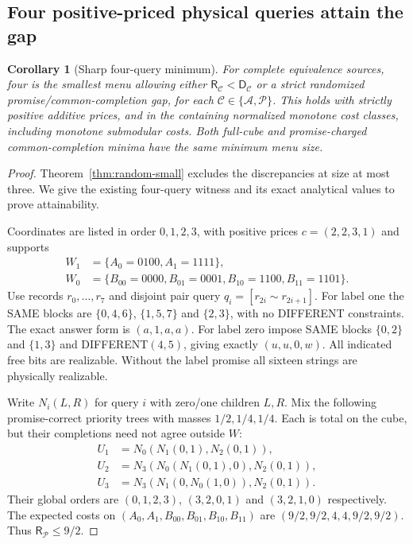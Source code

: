 \documentclass[pdflatex,sn-mathphys-num]{sn-jnl}
\newcommand{\DR}{\mathsf{D}}
\newcommand{\RR}{\mathsf{R}}
\theoremstyle{thmstyleone}
\newtheorem{corollary}[theorem]{Corollary}
\theoremstyle{thmstylethree}
\theoremstyle{thmstyletwo}
\begin{document}
\subsection{Four positive-priced physical queries attain the gap}
\begin{corollary}[Sharp four-query minimum]\label{cor:random-minimum}
For complete equivalence sources, four is the smallest menu allowing either $\RR_{\mathcal C}<\DR_{\mathcal C}$ or a strict randomized promise/common-completion gap, for each $\mathcal C\in\{\mathcal A,\mathcal P\}$. This holds with strictly positive additive prices, and in the containing normalized monotone cost classes, including monotone submodular costs. Both full-cube and promise-charged common-completion minima have the same minimum menu size.
\end{corollary}
\begin{proof}
Theorem~\ref{thm:random-small} excludes the discrepancies at size at most three. We give the existing four-query witness and its exact analytical values to prove attainability.

Coordinates are listed in order $0,1,2,3$, with positive prices $c=(2,2,3,1)$ and supports
\begin{align*}
 W_1&=\{A_0=0100,A_1=1111\},\\
 W_0&=\{B_{00}=0000,B_{01}=0001,B_{10}=1100,B_{11}=1101\}.
\end{align*}
Use records $r_0,\ldots,r_7$ and disjoint pair query $q_i=[r_{2i}\sim r_{2i+1}]$. For label one the SAME blocks are $\{0,4,6\}$, $\{1,5,7\}$ and $\{2,3\}$, with no DIFFERENT constraints. The exact answer form is $(a,1,a,a)$. For label zero impose SAME blocks $\{0,2\}$ and $\{1,3\}$ and DIFFERENT$(4,5)$, giving exactly $(u,u,0,w)$. All indicated free bits are realizable. Without the label promise all sixteen strings are physically realizable.

Write $N_i(L,R)$ for query $i$ with zero/one children $L,R$. Mix the following promise-correct priority trees with masses $1/2,1/4,1/4$. Each is total on the cube, but their completions need not agree outside $W$:
\begin{align*}
 U_1&=N_0(N_1(0,1),N_2(0,1)),\\
 U_2&=N_3(N_0(N_1(0,1),0),N_2(0,1)),\\
 U_3&=N_3(N_1(0,N_0(1,0)),N_2(0,1)).
\end{align*}
Their global orders are $(0,1,2,3)$, $(3,2,0,1)$ and $(3,2,1,0)$ respectively. The expected costs on $(A_0,A_1,B_{00},B_{01},B_{10},B_{11})$ are $(9/2,9/2,4,4,9/2,9/2)$. Thus $\RR_{\mathcal P}\leq9/2$.


\end{proof}
\end{document}
